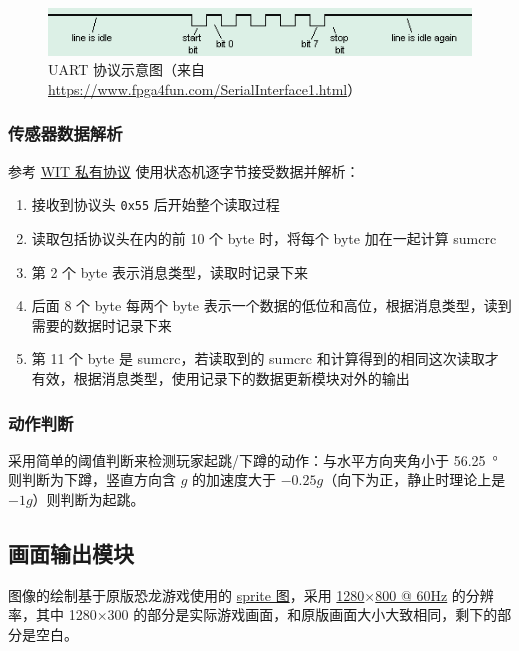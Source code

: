 \documentclass[UTF8, 11pt, fontset=none]{ctexart}
\begin{document}
\begin{figure}[H]
    \centering
    \includegraphics[width=\textwidth]{images/uart.png}
    \vspace{-16pt}
    \caption{UART 协议示意图（来自 \url{https://www.fpga4fun.com/SerialInterface1.html}）}
    \label{uart}
\end{figure}

\subsubsection{传感器数据解析}

参考 \href{https://wit-motion.yuque.com/wumwnr/ltst03/vl3tpy}{WIT 私有协议} 使用状态机逐字节接受数据并解析：

\begin{enumerate}
    \item 接收到协议头 \texttt{0x55} 后开始整个读取过程
    \item 读取包括协议头在内的前 10 个 byte 时，将每个 byte 加在一起计算 sumcrc
    \item 第 2 个 byte 表示消息类型，读取时记录下来
    \item 后面 8 个 byte 每两个 byte 表示一个数据的低位和高位，根据消息类型，读到需要的数据时记录下来
    \item 第 11 个 byte 是 sumcrc，若读取到的 sumcrc 和计算得到的相同这次读取才有效，根据消息类型，使用记录下的数据更新模块对外的输出
\end{enumerate}

\subsubsection{动作判断}

采用简单的阈值判断来检测玩家起跳/下蹲的动作：与水平方向夹角小于 \SI{56.25}{\degree} 则判断为下蹲，竖直方向含 $g$ 的加速度大于 $-0.25 g$（向下为正，静止时理论上是 $-1g$）则判断为起跳。

\subsection{画面输出模块}

图像的绘制基于原版恐龙游戏使用的 \href{https://github.com/chromium/chromium/blob/3b31f1cbd28e0a1199defe6f6b37001cef4c4790/components/neterror/resources/images/default_200_percent/offline/200-offline-sprite.png}{sprite 图}，采用 \href{http://tinyvga.com/vga-timing/1280x800@60Hz}{1280$\times$800 @ 60Hz} 的分辨率，其中 1280$\times$300 的部分是实际游戏画面，和原版画面大小大致相同，剩下的部分是空白。
\end{document}
